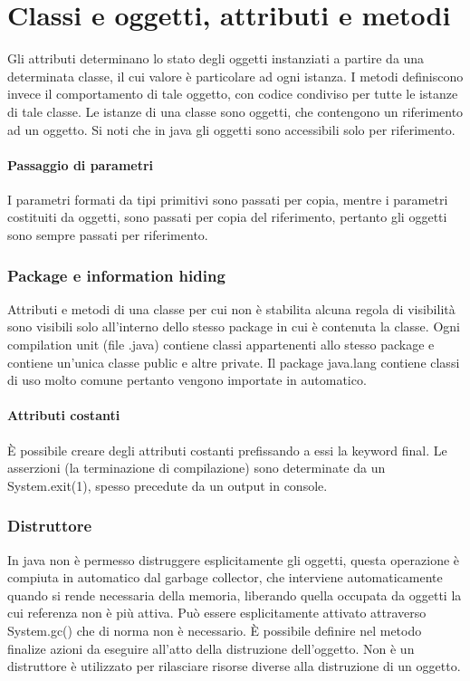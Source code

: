 \chapter{Classi e oggetti, attributi e metodi}
Gli attributi determinano lo stato degli oggetti instanziati a partire da una determinata classe, il cui valore \`e particolare ad ogni istanza. I metodi definiscono 
invece il comportamento di tale oggetto, con codice condiviso per tutte le istanze di tale classe. Le istanze di una classe sono oggetti, che contengono un riferimento
ad un oggetto. Si noti che in java gli oggetti sono accessibili solo per riferimento. 
\subsubsection{Passaggio di parametri}
I parametri formati da tipi primitivi sono passati per copia, mentre i parametri costituiti da oggetti, sono passati per copia del riferimento, pertanto gli oggetti sono
sempre passati per riferimento.
\subsection{Package e information hiding}
Attributi e metodi di una classe per cui non \`e stabilita alcuna regola di visibilit\`a sono visibili solo all'interno dello stesso package in cui \`e contenuta la 
classe. Ogni compilation unit (file .java) contiene classi appartenenti allo stesso package e contiene un'unica classe public e altre private. Il package java.lang
contiene classi di uso molto comune pertanto vengono importate in automatico. 
\subsubsection{Attributi costanti}
\`E possibile creare degli attributi costanti prefissando a essi la keyword final. Le asserzioni (la terminazione di compilazione) sono determinate da un System.exit(1),
spesso precedute da un output in console. 
\subsection{Distruttore}
In java non \`e permesso distruggere esplicitamente gli oggetti, questa operazione \`e compiuta in automatico dal garbage collector, che interviene automaticamente quando
si rende necessaria della memoria, liberando quella occupata da oggetti la cui referenza non \`e pi\`u attiva. Pu\`o essere esplicitamente attivato attraverso System.gc()
che di norma non \`e necessario. \`E possibile definire nel metodo finalize azioni da eseguire all'atto della distruzione dell'oggetto. Non \`e un distruttore \`e 
utilizzato per rilasciare risorse diverse alla distruzione di un oggetto.

